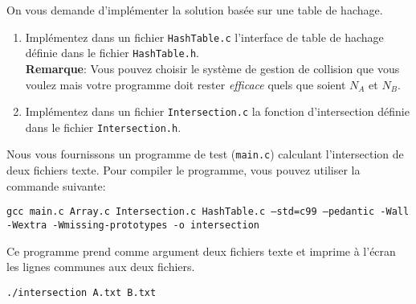 \documentclass[a4paper,10pt]{article}
\begin{document}
On vous demande d'implémenter la solution basée sur une table de
hachage.

\begin{enumerate}
\item Implémentez dans un fichier \texttt{HashTable.c} l'interface de table de hachage définie dans le fichier \texttt{HashTable.h}.\\
  \textbf{Remarque}: Vous pouvez choisir le système de gestion de collision
  que vous voulez mais votre programme doit rester {\it efficace} quels
  que soient $N_A$ et $N_B$.
\item Implémentez dans un fichier \texttt{Intersection.c} la fonction d'intersection définie dans le fichier \texttt{Intersection.h}.
\end{enumerate}

Nous vous fournissons un programme de test (\texttt{main.c}) calculant l'intersection de deux fichiers texte.
Pour compiler le programme, vous pouvez utiliser la commande suivante:

{\small \texttt{gcc main.c Array.c Intersection.c HashTable.c --std=c99 --pedantic -Wall -Wextra -Wmissing-prototypes -o intersection}}

Ce programme prend comme argument deux fichiers texte et imprime à l'écran les lignes communes aux deux fichiers.

{\small \texttt{./intersection A.txt B.txt}}
\end{document}
